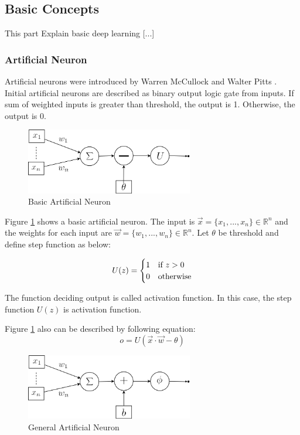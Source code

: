 \documentclass[draft,dvipsnames]{drexel-thesis}
\begin{document}
\begin{thesis}
\subsection{Basic Concepts}\label{subsec:basicDL}
{\color{blue} This part Explain basic deep learning [...]}

\subsubsection{Artificial Neuron}\label{subsubsec:AN}
Artificial neurons were introduced by Warren McCullock and Walter Pitts \cite{raschka2015python}. Initial artificial neurons are described as binary output logic gate from inputs. If sum of weighted inputs is greater than threshold, the output is 1. Otherwise, the output is 0.

\begin{figure}[t!]
    \centering
    \includegraphics[width=0.65\textwidth]{pictures/figures/basic_AN.png}
    \caption{Basic Artificial Neuron}
    \label{fig:basic_AN}
\end{figure}

Figure \ref{fig:basic_AN} shows a basic artificial neuron. The input is $\vec{x} = \{x_1, ..., x_n\} \in \mathbb{R}^n$ and the weights for each input are $\vec{w} = \{w_1, ..., w_n\} \in \mathbb{R}^n$. Let $\theta$ be threshold and define step function as below:

$$U(z)=
	\begin{cases} 
		\hfill 1 \hfill & \text{if $z > 0$} \\
		\hfill 0 \hfill & \text{otherwise} \\
	\end{cases}
$$

The function deciding output is called activation function. In this case, the step function $U(z)$ is activation function.

Figure \ref{fig:basic_AN} also can be described by following equation:
$$ o = U(\vec{x}\cdot\vec{w}-\theta)$$

\begin{figure}[t!]
    \centering
    \includegraphics[width=0.65\textwidth]{pictures/figures/general_AN.png}
    \caption{General Artificial Neuron}
    \label{fig:general_AN}
\end{figure}


\end{thesis}
\end{document}

